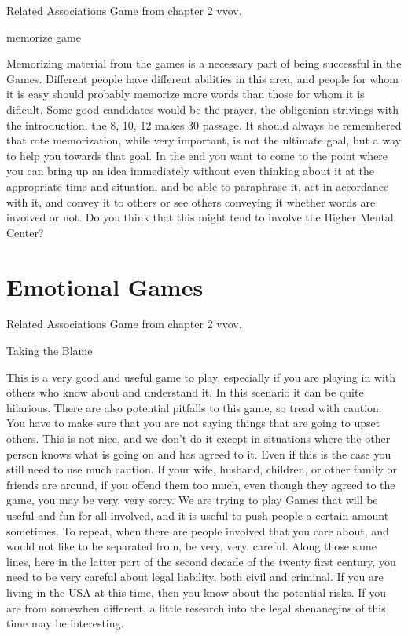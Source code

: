 \documentclass[12pt,letterpaper]{book}
\begin{document}
Related Associations Game from chapter 2 vvov.

memorize game

Memorizing material from the games is a necessary part of being successful in the Games. Different people have different abilities in this area, and people for whom it is easy should probably memorize more words than those for whom it is dificult. Some good candidates would be the prayer, the obligonian strivings with the introduction, the 8, 10, 12 makes 30 passage. It should always be remembered that rote memorization, while very important, is not the ultimate goal, but a way to help you towards that goal. In the end you want to come to the point where you can bring up an idea immediately without even thinking about it at the appropriate time and situation, and be able to paraphrase it, act in accordance with it, and convey it to others or see others conveying it whether words are involved or not. Do you think that this might tend to involve the Higher Mental Center?

\section{Emotional Games}

Related Associations Game from chapter 2 vvov.

Taking the Blame

This is a very good and useful game to play, especially if you are playing in with others who know about and understand it. In this scenario it can be quite hilarious. There are also potential pitfalls to this game, so tread with caution. You have to make sure that you are not saying things that are going to upset others. This is not nice, and we don't do it except in situations where the other person knows what is going on and has agreed to it. Even if this is the case you still need to use much caution. If your wife, husband, children, or other family or friends are around, if you offend them too much, even though they agreed to the game, you may be very, very sorry. We are trying to play Games that will be useful and fun for all involved, and it is useful to push people a certain amount sometimes. To repeat, when there are people involved that you care about, and would not like to be separated from, be very, very, careful. Along those same lines, here in the latter part of the second decade of the twenty first century, you need to be very careful about legal liability, both civil and criminal. If you are living in the USA at this time, then you know about the potential risks. If you are from somewhen different, a little research into the legal shenanegins of this time may be interesting.
\end{document}
